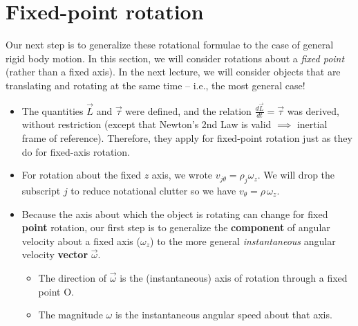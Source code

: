 \documentclass[11pt, letterpaper, openany]{book}
\begin{document}
\section*{Fixed-point rotation}

Our next step is to generalize these rotational formulae to the case of general rigid body motion. In this section, we will consider rotations about a \textit{fixed point} (rather than a fixed axis). In the next lecture, we will consider objects that are translating and rotating at the same time -- i.e., the most general case!

\begin{itemize}
    \item The quantities $\vec{L}$ and $\vec{\tau}$ were defined, and the relation $\frac{d\vec{L}}{dt} = \vec{\tau}$ was derived, without restriction (except that Newton's 2nd Law is valid $\implies$ inertial frame of reference). Therefore, they apply for fixed-point rotation just as they do for fixed-axis rotation.
    \item For rotation about the fixed $z$ axis, we wrote $v_{j\theta} = \rho_j \omega_z$. We will drop the subscript $j$ to reduce notational clutter so we have $v_\theta = \rho\,\omega_z$.
    \item Because the axis about which the object is rotating can change for fixed \textbf{point} rotation, our first step is to generalize the \textbf{component} of angular velocity about a fixed axis ($\omega_z$) to the more general \textit{instantaneous} angular velocity \textbf{vector} $\vec{\omega}$.
    \begin{itemize}
        \item The direction of $\vec{\omega}$ is the (instantaneous) axis of rotation through a fixed point O.
        \item The magnitude $\omega$ is the instantaneous angular speed about that axis.
    \end{itemize}
\end{itemize}
\end{document}
